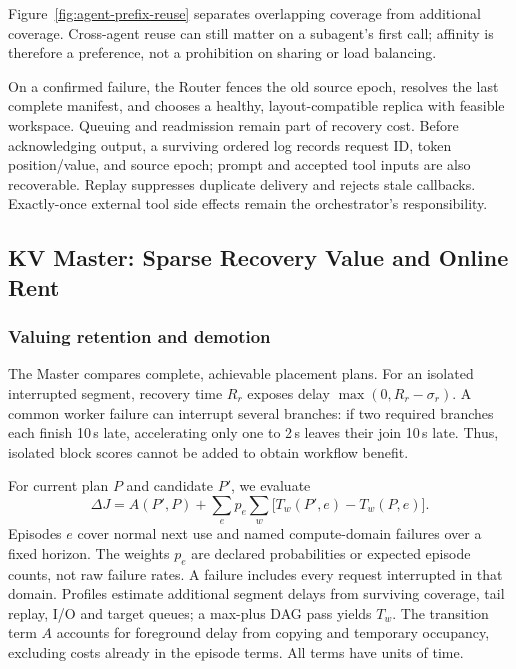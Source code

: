 Figure~\ref{fig:agent-prefix-reuse} separates overlapping coverage from
additional coverage. Cross-agent reuse can still matter on a subagent's
first call; affinity is therefore a preference, not a prohibition on
sharing or load balancing.

On a confirmed failure, the Router fences the old source epoch, resolves
the last complete manifest, and chooses a healthy, layout-compatible
replica with feasible workspace. Queuing and readmission remain part of
recovery cost. Before acknowledging output, a surviving ordered log
records request ID, token position/value, and source epoch; prompt and
accepted tool inputs are also recoverable. Replay suppresses duplicate
delivery and rejects stale callbacks. Exactly-once external tool side
effects remain the orchestrator's responsibility.

\subsection{KV Master: Sparse Recovery Value and Online Rent}
\label{sec:kv-master}

\subsubsection{Valuing retention and demotion}
\label{sec:placement-value}

The Master compares complete, achievable placement plans. For an isolated
interrupted segment, recovery time $R_r$ exposes delay
$\max(0,R_r-\sigma_r)$. A common worker failure can interrupt several
branches: if two required branches each finish 10\,s late, accelerating
only one to 2\,s leaves their join 10\,s late. Thus, isolated block scores
cannot be added to obtain workflow benefit.

For current plan $P$ and candidate $P'$, we evaluate
\begin{equation}
 \Delta J=A(P',P)+\sum_e p_e\sum_w
       \bigl[T_w(P',e)-T_w(P,e)\bigr].
 \label{eq:value}
\end{equation}
Episodes $e$ cover normal next use and named compute-domain failures over
a fixed horizon. The weights $p_e$ are declared probabilities or expected
episode counts, not raw failure rates. A failure includes every request
interrupted in that domain. Profiles estimate additional segment delays
from surviving coverage, tail replay, I/O and target queues; a max-plus
DAG pass yields $T_w$. The transition term $A$ accounts for foreground
delay from copying and temporary occupancy, excluding costs already in
the episode terms. All terms have units of time.

